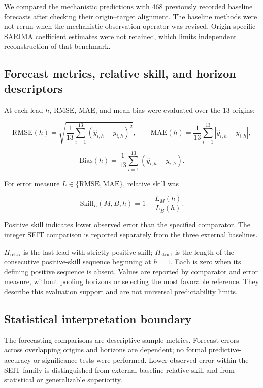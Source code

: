 \documentclass[pdflatex,sn-mathphys-ay]{sn-jnl}
\begin{document}
We compared the mechanistic predictions with 468 previously recorded baseline forecasts after checking their origin--target alignment. The baseline methods were not rerun when the mechanistic observation operator was revised. Origin-specific SARIMA coefficient estimates were not retained, which limits independent reconstruction of that benchmark.

\subsection{Forecast metrics, relative skill, and horizon descriptors}

At each lead $h$, RMSE, MAE, and mean bias were evaluated over the 13 origins:

\[
\mathrm{RMSE}(h)=\sqrt{\frac1{13}\sum_{i=1}^{13}(\widehat y_{i,h}-y_{i,h})^2},\qquad
\mathrm{MAE}(h)=\frac1{13}\sum_{i=1}^{13}|\widehat y_{i,h}-y_{i,h}|,
\]

\[
\mathrm{Bias}(h)=\frac1{13}\sum_{i=1}^{13}(\widehat y_{i,h}-y_{i,h}).
\]

For error measure $L\in\{\mathrm{RMSE},\mathrm{MAE}\}$, relative skill was

\[
\mathrm{Skill}_L(M,B,h)=1-\frac{L_M(h)}{L_B(h)}.
\]

Positive skill indicates lower observed error than the specified comparator. The integer SEIT comparison is reported separately from the three external baselines.

$H_{\mathrm{relax}}$ is the last lead with strictly positive skill; $H_{\mathrm{strict}}$ is the length of the consecutive positive-skill sequence beginning at $h=1$. Each is zero when its defining positive sequence is absent. Values are reported by comparator and error measure, without pooling horizons or selecting the most favorable reference. They describe this evaluation support and are not universal predictability limits.

\subsection{Statistical interpretation boundary}

The forecasting comparisons are descriptive sample metrics. Forecast errors across overlapping origins and horizons are dependent; no formal predictive-accuracy or significance tests were performed. Lower observed error within the SEIT family is distinguished from external baseline-relative skill and from statistical or generalizable superiority.
\end{document}
